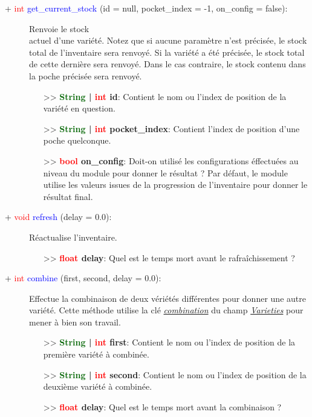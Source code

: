 \documentclass[a4paper, 11pt]{article}
\begin{document}
	\begin{description}
		\item [+ \textcolor{red}{int} \textcolor{blue}{get\_current\_stock} (id = null, pocket\_index = 
		-1, on\_config = false):] Renvoie le stock \\actuel d'une variété. Notez que si aucune paramètre 
		n'est précisée, le stock total de l'inventaire sera renvoyé. Si la variété a été précisée, le stock 
		total de cette dernière sera renvoyé. Dans le cas contraire, le stock contenu dans la poche précisée 
		sera renvoyé.
		\begin{itemize}
			\item[>> \textbf{\textcolor{darkgreen}{String} | \textcolor{red}{int} id}:] Contient le nom ou 
			l'index de position de la variété en question.
			\item[>> \textbf{\textcolor{darkgreen}{String} | \textcolor{red}{int} pocket\_index}:] Contient 
			l'index de position d'une poche quelconque.
			\item[>> \textbf{\textcolor{red}{bool} on\_config}:] Doit-on utilisé les configurations 
			éffectuées au niveau du module pour donner le résultat ? Par défaut, le module utilise les 
			valeurs issues de la progression de l'inventaire pour donner le résultat final.\\
		\end{itemize}
	\end{description}
	\begin{description}
		\item [+ \textcolor{red}{void} \textcolor{blue}{refresh} (delay = 0.0):] Réactualise l'inventaire.
		\begin{itemize}
			\item [>> \textbf{\textcolor{red}{float} delay}:] Quel est le temps mort avant le 
			rafraîchissement ?\\
		\end{itemize}
	\end{description}
	\begin{description}
		\item [+ \textcolor{red}{int} \textcolor{blue}{combine} (first, second, delay = 0.0):] Effectue la 
		combinaison de deux vériétés différentes pour donner une autre variété. Cette méthode utilise la clé
		\textit{\hyperlink{combination}{combination}} du champ \textit{\hyperlink{varieties}{Varieties}} 
		pour mener à bien son travail.
		\begin{itemize}
			\item[>> \textbf{\textcolor{darkgreen}{String} | \textcolor{red}{int} first}:] Contient le 
			nom ou l'index de position de la première variété à combinée.
			\item[>> \textbf{\textcolor{darkgreen}{String} | \textcolor{red}{int} second}:] Contient le 
			nom ou l'index de position de la deuxième variété à combinée.
			\item [>> \textbf{\textcolor{red}{float} delay}:] Quel est le temps mort avant la combinaison ?
			\\
		\end{itemize}
	\end{description}
\end{document}
